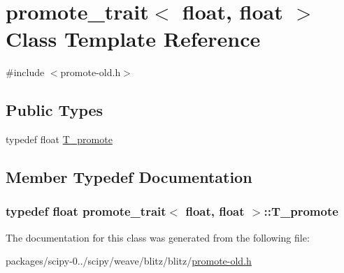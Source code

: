 \hypertarget{classpromote__trait_3_01float_00_01float_01_4}{}\section{promote\+\_\+trait$<$ float, float $>$ Class Template Reference}
\label{classpromote__trait_3_01float_00_01float_01_4}


{\ttfamily \#include $<$promote-\/old.\+h$>$}

\subsection*{Public Types}
\begin{DoxyCompactItemize}
\item 
typedef float \hyperlink{classpromote__trait_3_01float_00_01float_01_4_ad473e5ec04276c3af2b8a611a38cd109}{T\+\_\+promote}
\end{DoxyCompactItemize}


\subsection{Member Typedef Documentation}
\hypertarget{classpromote__trait_3_01float_00_01float_01_4_ad473e5ec04276c3af2b8a611a38cd109}{}
\subsubsection[{T\+\_\+promote}]{\setlength{\rightskip}{0pt plus 5cm}typedef float {\bf promote\+\_\+trait}$<$ float, float $>$\+::{\bf T\+\_\+promote}}\label{classpromote__trait_3_01float_00_01float_01_4_ad473e5ec04276c3af2b8a611a38cd109}


The documentation for this class was generated from the following file\+:\begin{DoxyCompactItemize}
\item 
packages/scipy-\/0../scipy/weave/blitz/blitz/\hyperlink{promote-old_8h}{promote-\/old.\+h}\end{DoxyCompactItemize}
